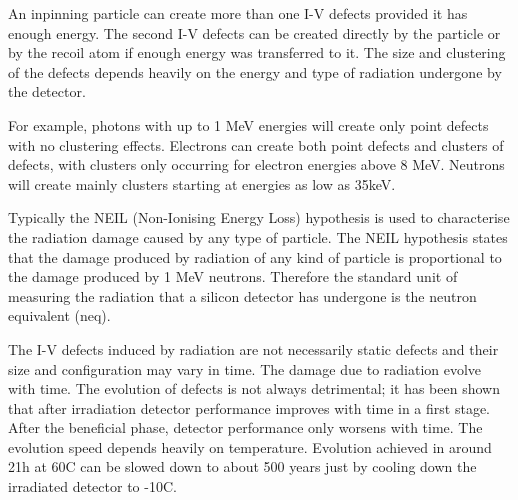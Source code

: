 An inpinning particle can create more than one I-V defects provided it has enough energy. The second I-V defects can be created directly by the particle or by the recoil atom if enough energy was transferred to it. The size and clustering of the defects depends heavily on the energy and type of radiation undergone by the detector. 


For example, photons with up to 1 MeV energies will create only point defects with no clustering effects. Electrons can create both point defects and clusters of defects, with clusters only occurring for electron energies above 8 MeV. Neutrons will create mainly clusters starting at energies as low as 35keV. 

Typically the NEIL (Non-Ionising Energy Loss) hypothesis is used to characterise the radiation damage caused by any type of particle. The NEIL hypothesis states that the damage produced by radiation of any kind of particle is proportional to the damage produced by 1 MeV neutrons. Therefore the standard unit of measuring the radiation that a silicon detector has undergone is the neutron equivalent (neq).

The I-V defects induced by radiation are not necessarily static defects and their size and configuration may vary in time. The damage due to radiation evolve with time. The evolution of defects is not always detrimental; it has been shown that after irradiation detector performance improves with time in a first stage. After the beneficial phase, detector performance only worsens with time. The evolution speed depends heavily on temperature. Evolution achieved in around 21h at 60C can be slowed down to about 500 years just by cooling down the irradiated detector to -10C. 


